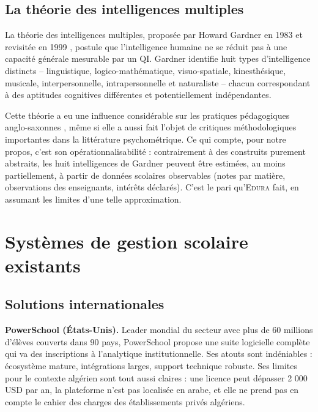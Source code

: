 \documentclass[12pt,a4paper,oneside]{report}
\newcommand{\edura}{\textsc{Edura}}
\begin{document}
\subsection{La théorie des intelligences multiples}

La théorie des intelligences multiples, proposée par Howard Gardner en 1983 \autocite{gardner1983frames} et revisitée en 1999 \autocite{gardner1999intelligence}, postule que l'intelligence humaine ne se réduit pas à une capacité générale mesurable par un QI. Gardner identifie huit types d'intelligence distincts -- linguistique, logico-mathématique, visuo-spatiale, kinesthésique, musicale, interpersonnelle, intrapersonnelle et naturaliste -- chacun correspondant à des aptitudes cognitives différentes et potentiellement indépendantes.

Cette théorie a eu une influence considérable sur les pratiques pédagogiques anglo-saxonnes \autocite{armstrong2009multiple}, même si elle a aussi fait l'objet de critiques méthodologiques importantes dans la littérature psychométrique. Ce qui compte, pour notre propos, c'est son opérationnalisabilité : contrairement à des construits purement abstraits, les huit intelligences de Gardner peuvent être estimées, au moins partiellement, à partir de données scolaires observables (notes par matière, observations des enseignants, intérêts déclarés). C'est le pari qu'\edura{} fait, en assumant les limites d'une telle approximation.

\section{Systèmes de gestion scolaire existants}

\subsection{Solutions internationales}

\textbf{PowerSchool (États-Unis).} Leader mondial du secteur avec plus de 60 millions d'élèves couverts dans 90 pays, PowerSchool propose une suite logicielle complète qui va des inscriptions à l'analytique institutionnelle. Ses atouts sont indéniables : écosystème mature, intégrations larges, support technique robuste. Ses limites pour le contexte algérien sont tout aussi claires : une licence peut dépasser 2 000 USD par an, la plateforme n'est pas localisée en arabe, et elle ne prend pas en compte le cahier des charges des établissements privés algériens.
\end{document}
